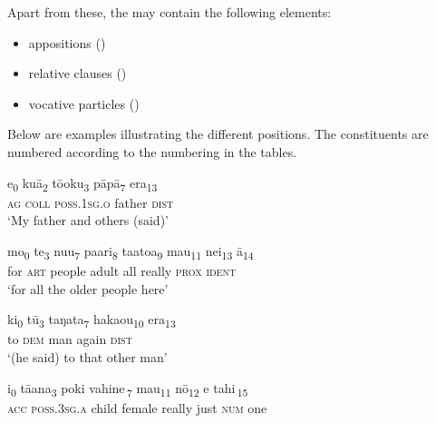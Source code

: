Apart from these, the  may contain the following elements:

\begin{itemize}
\item 
appositions ()

\item 
relative clauses ()

\item 
vocative particles ()

\end{itemize}

Below are examples illustrating the different  positions. The constituents are numbered according to the numbering in the tables.

\ea\label{ex:5.1}
\gll e\textsubscript{0} kuā\textsubscript{2} tō{\ꞌ}oku\textsubscript{3} pāpā\textsubscript{7} era\textsubscript{13}\\
\textsc{ag} \textsc{coll} \textsc{poss.1sg.o} father \textsc{dist}\\

\glt 
‘My father and others (said)’ \textstyleExampleref{[R412.383]} 
\z

\ea\label{ex:5.2}
\gll mo\textsubscript{0} te\textsubscript{3} nu{\ꞌ}u\textsubscript{7} pa{\ꞌ}ari\textsubscript{8} ta{\ꞌ}ato{\ꞌ}a\textsubscript{9} mau\textsubscript{11} nei\textsubscript{13} {\ꞌ}ā\textsubscript{14}\\
for \textsc{art} people adult all really \textsc{prox} \textsc{ident}\\

\glt 
‘for all the older people here’ \textstyleExampleref{[R207.017]} 
\z

\ea\label{ex:5.3}
\gll ki\textsubscript{0} tū\textsubscript{3} taŋata\textsubscript{7} haka{\ꞌ}ou\textsubscript{10} era\textsubscript{13} \\
to \textsc{dem} man again \textsc{dist} \\

\glt 
‘(he said) to that other man’ \textstyleExampleref{[R102.020]} 
\z

\ea\label{ex:5.4}
\gll i\textsubscript{0} tā{\ꞌ}ana\textsubscript{3} {\ob}poki vahine\,{\cb}\textsubscript{7} mau\textsubscript{11} nō\textsubscript{12} {\ob}e tahi\,{\cb}\textsubscript{15}\\
\textsc{acc} \textsc{poss.3sg.a} {\db}child female really just {\db}\textsc{num} one\\

